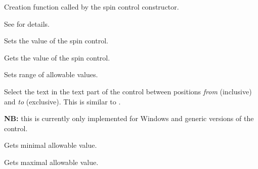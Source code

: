 Creation function called by the spin control constructor.

See  for details.

\label{wxspinctrlsetvalue}



Sets the value of the spin control.

\label{wxspinctrlgetvalue}


Gets the value of the spin control.

\label{wxspinctrlsetrange}


Sets range of allowable values.

\label{wxspinctrlsetselection}


Select the text in the text part of the control between  positions 
{\it from} (inclusive) and {\it to} (exclusive). This is similar to 
.

{\bf NB:} this is currently only implemented for Windows and generic versions
of the control.

\label{wxspinctrlgetmin}


Gets minimal allowable value.

\label{wxspinctrlgetmax}


Gets maximal allowable value.

